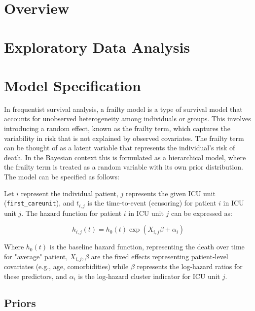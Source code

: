 \section{Overview}
\label{sec:ch2-overview}




\section{Exploratory Data Analysis}
\label{sec:exploratory-data-analysis}





\section{Model Specification}
\label{sec:model-specification}

In frequentist survival analysis, a frailty model is a type of survival model that accounts for unobserved heterogeneity among individuals or groups. This involves introducing a random effect, known as the frailty term, which captures the variability in risk that is not explained by observed covariates. The frailty term can be thought of as a latent variable that represents the individual's risk of death. In the Bayesian context this is formulated as a hierarchical model, where the frailty term is treated as a random variable with its own prior distribution. The model can be specified as follows:

Let \(i\) represent the individual patient, \(j\) represents the given ICU unit (\texttt{first\_careunit}), and \(t_{i,j}\) is the time-to-event (censoring) for patient \(i\) in ICU unit \(j\). The hazard function for patient \(i\) in ICU unit \(j\) can be expressed as:

\begin{equation}
    h_{i,j}(t) = h_0(t) \exp(X_{i,j} \beta + \alpha_i)
\end{equation}

Where \(h_0(t)\) is the baseline hazard function, representing the death over time for "average" patient, \(X_{i,j}, \beta\) are the fixed effects representing patient-level covariates (e.g., age, comorbidities) while \(\beta\) represents the log-hazard ratios for these predictors, and \(\alpha_i\) is the log-hazard cluster indicator for ICU unit \(j\). 

\subsection{Priors}


